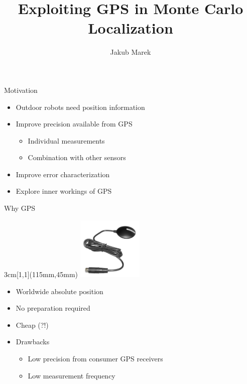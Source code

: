 \documentclass[utf8,12pt]{beamer}
\title{Exploiting GPS in Monte Carlo Localization}
\author{Jakub Marek}
\newcommand{\imageframe}[3]{{
\setbeamertemplate{background}{
    \vbox to \paperheight{\vfil\hbox to \paperwidth{\hfil
    \texttt{[image: \#1]} %
    \hfil}\vfil}
    }
\setbeamercolor{background canvas}{bg=#2}
\begin{frame}[plain]
\end{frame}
}}
\begin{document}
\begin{frame}[plain]
    \titlepage
\end{frame}

\begin{frame}{Motivation}
    \begin{itemize}
        \item Outdoor robots need position information
        \item Improve precision available from GPS
        \begin{itemize}
            \item Individual measurements
            \item Combination with other sensors
        \end{itemize}
        \item Improve error characterization
        \item Explore inner workings of GPS
    \end{itemize}
\end{frame}


\begin{frame}{Why GPS}
    \begin{textblock*}{3cm}[1,1](115mm,45mm)
        \includegraphics[height=3cm]{img/receiver.jpg}
    \end{textblock*}
    \begin{itemize}
        \item Worldwide absolute position
        \item No preparation required
        \item Cheap (?!)
        \item Drawbacks
        \begin{itemize}
            \item Low precision from consumer GPS receivers
            \item Low measurement frequency
        \end{itemize}
    \end{itemize}
\end{frame}
\end{document}
